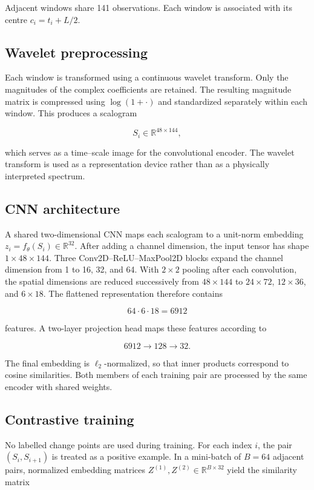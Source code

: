 \documentclass[
]{krantz}
\begin{document}
Adjacent windows share 141 observations. Each window is associated with its centre \(c_i=t_i+L/2\).

\subsection{Wavelet preprocessing}\label{wavelet-preprocessing}

Each window is transformed using a continuous wavelet transform. Only the magnitudes of the complex coefficients are retained. The resulting magnitude matrix is compressed using \(\log(1+\cdot)\) and standardized separately within each window. This produces a scalogram

\[
S_i\in\mathbb{R}^{48\times144},
\]

which serves as a time--scale image for the convolutional encoder. The wavelet transform is used as a representation device rather than as a physically interpreted spectrum.

\subsection{CNN architecture}\label{cnn-architecture}

A shared two-dimensional CNN maps each scalogram to a unit-norm embedding \(z_i=f_\theta(S_i)\in\mathbb{R}^{32}\). After adding a channel dimension, the input tensor has shape \(1\times48\times144\). Three Conv2D--ReLU--MaxPool2D blocks expand the channel dimension from 1 to 16, 32, and 64. With \(2\times2\) pooling after each convolution, the spatial dimensions are reduced successively from \(48\times144\) to \(24\times72\), \(12\times36\), and \(6\times18\). The flattened representation therefore contains

\[
64\cdot6\cdot18=6912
\]

features. A two-layer projection head maps these features according to

\[
6912\rightarrow128\rightarrow32.
\]

The final embedding is \(\ell_2\)-normalized, so that inner products correspond to cosine similarities. Both members of each training pair are processed by the same encoder with shared weights.

\subsection{Contrastive training}\label{contrastive-training}

No labelled change points are used during training. For each index \(i\), the pair \((S_i,S_{i+1})\) is treated as a positive example. In a mini-batch of \(B=64\) adjacent pairs, normalized embedding matrices \(Z^{(1)},Z^{(2)}\in\mathbb{R}^{B\times32}\) yield the similarity matrix
\end{document}
